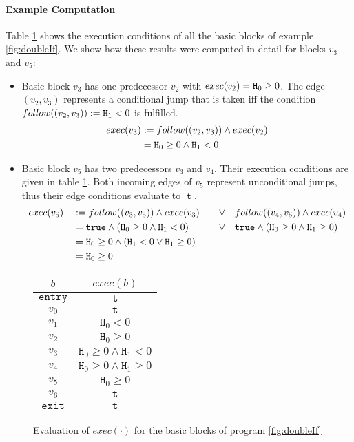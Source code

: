 \paragraph{Example Computation}
Table \ref{tab:exec} shows the execution conditions of all the basic blocks of example \ref{fig:doubleIf}. We show how these results were computed in detail for blocks $v_3$ and $v_5$:
\begin{itemize}
    \item Basic block $v_3$ has one predecessor $v_2$ with $exec(v_2) = \mathtt{H}_0 \geq 0$. The edge $(v_2, v_3)$ represents a conditional jump that is taken iff the condition $follow((v_2, v_3)) := \mathtt{H}_1 < 0$ is fulfilled.
    \begin{align*}
        exec(v_3) &:= follow((v_2, v_3)) \land exec(v_2) \\
        &= \mathtt{H}_0 \geq 0 \land \mathtt{H}_1 < 0 \\
    \end{align*}
    
    \item Basic block $v_5$ has two predecessors $v_3$ and $v_4$. Their execution conditions are given in table \ref{tab:exec}. Both incoming edges of $v_5$ represent unconditional jumps, thus their edge conditions evaluate to $\mttt$.
    \begin{alignat*}{2}
        exec(v_5) \quad &:= follow((v_3, v_5)) \land exec(v_3) \quad &\lor & \quad follow((v_4, v_5)) \land exec(v_4)\\
        &= \mathtt{true} \land (\mathtt{H}_0 \geq 0 \land \mathtt{H}_1 < 0) &\lor & \quad \mathtt{true} \land (\mathtt{H}_0 \geq 0 \land \mathtt{H}_1 \geq 0)\\
        &= \mathtt{H}_0 \geq 0 \land (\mathtt{H}_1 < 0 \lor \mathtt{H}_1 \geq 0) \\
        &= \mathtt{H}_0 \geq 0
    \end{alignat*}
\end{itemize}

\begin{figure}
    \centering
    \begin{tabular}{ |c|c| } 
        \hline
        $b$ & $exec(b)$ \\
        \hline
        $\mathtt{entry}$ & $\mttt$ \\
        $v_0$ & $\mttt$ \\
        $v_1$ & $\mathtt{H}_0 < 0$ \\
        $v_2$ & $\mathtt{H}_0 \geq 0$ \\
        $v_3$ & $\mathtt{H}_0 \geq 0 \land \mathtt{H}_1 < 0$ \\
        $v_4$ & $\mathtt{H}_0 \geq 0 \land \mathtt{H}_1 \geq 0$ \\
        $v_5$ & $\mathtt{H}_0 \geq 0$ \\
        $v_6$ & $\mttt$ \\
        $\mathtt{exit}$ & $\mttt$ \\
        \hline
    \end{tabular}
    \caption{Evaluation of $exec(\cdot)$ for the basic blocks of program \ref{fig:doubleIf}}
    \label{tab:exec}
\end{figure}

